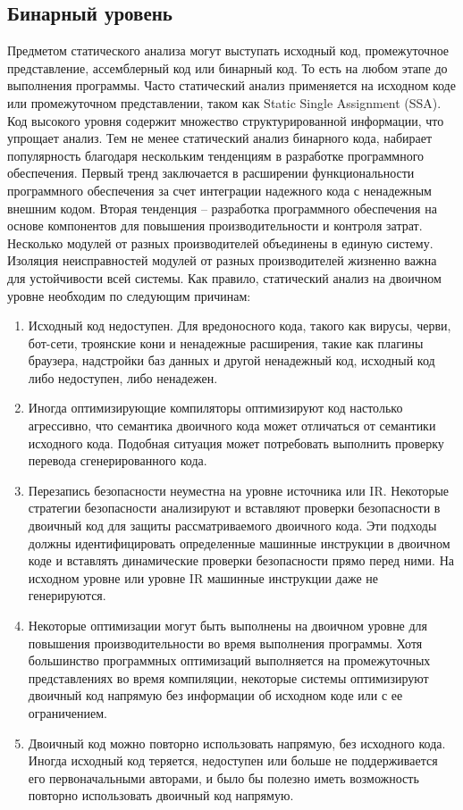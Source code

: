 \subsection{Бинарный уровень}
Предметом статического анализа могут выступать исходный код, промежуточное представление, ассемблерный код или
бинарный код. То есть на любом этапе до выполнения программы. Часто статический анализ применяется на исходном коде
или промежуточном представлении, таком как  Static Single Assignment (SSA). Код высокого уровня содержит множество 
структурированной информации, что упрощает анализ. Тем не менее статический анализ бинарного кода, набирает популярность 
благодаря нескольким тенденциям в разработке программного обеспечения. Первый тренд заключается в расширении 
функциональности программного обеспечения за счет интеграции надежного кода с ненадежным внешним кодом. Вторая тенденция --
разработка программного обеспечения на основе компонентов для повышения производительности и контроля затрат.
Несколько модулей от разных производителей объединены в единую систему. Изоляция неисправностей модулей от разных производителей жизненно важна для устойчивости всей системы.
Как правило, статический анализ на двоичном уровне необходим по следующим причинам\cite{Zeng2012StaticAO}:
\begin{enumerate}
        \item Исходный код недоступен. Для вредоносного кода, такого как вирусы, черви, бот-сети, троянские кони и 
            ненадежные расширения, такие как плагины браузера, надстройки баз данных и другой ненадежный код, исходный код 
            либо недоступен, либо ненадежен. 
        \item Иногда оптимизирующие компиляторы оптимизируют код настолько агрессивно, что семантика двоичного 
            кода может отличаться от семантики исходного кода. Подобная ситуация может потребовать выполнить проверку 
            перевода сгенерированного кода.
        \item Перезапись безопасности неуместна на уровне источника или IR. Некоторые стратегии безопасности анализируют и 
            вставляют проверки безопасности в двоичный код для защиты рассматриваемого двоичного кода. Эти подходы должны 
            идентифицировать определенные машинные инструкции в двоичном коде и вставлять динамические проверки 
            безопасности прямо перед ними. На исходном уровне или уровне IR машинные инструкции даже не генерируются.
        \item Некоторые оптимизации могут быть выполнены на двоичном уровне для повышения производительности во время  
            выполнения программы. Хотя большинство программных оптимизаций выполняется на промежуточных представлениях во 
            время компиляции, некоторые системы оптимизируют двоичный код напрямую без информации об исходном коде или с  
            ее ограничением.
        \item Двоичный код можно повторно использовать напрямую, без исходного кода. Иногда исходный код теряется, 
            недоступен или больше не поддерживается его первоначальными авторами, и было бы полезно иметь возможность 
            повторно использовать двоичный код напрямую.
\end{enumerate}

